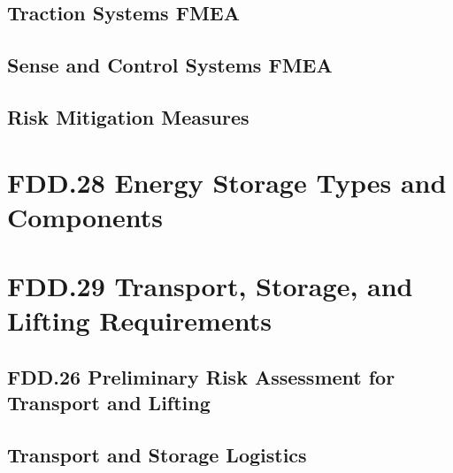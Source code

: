 \subsection{Traction Systems FMEA}
\subsection{Sense and Control Systems FMEA}
\subsection{Risk Mitigation Measures}

\section{FDD.28 Energy Storage Types and Components}

\section{FDD.29 Transport, Storage, and Lifting Requirements}
\subsection{FDD.26 Preliminary Risk Assessment for Transport and Lifting}
\subsection{Transport and Storage Logistics}

\newpage
{}
 {
    \newpage
}